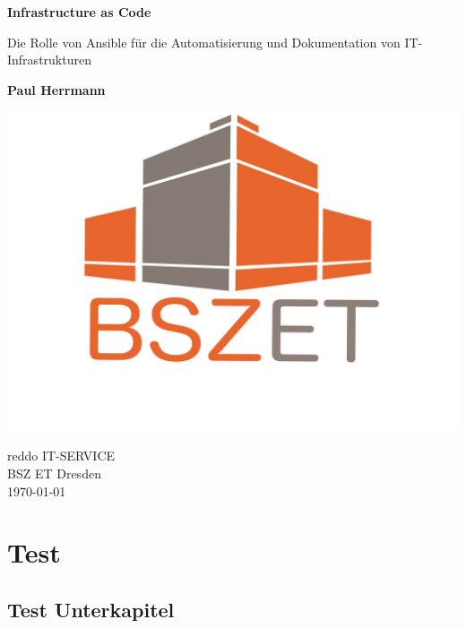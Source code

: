 \documentclass[11pt]{article}
\begin{document}
\begin{titlepage}
    \begin{center}
        \vspace*{1cm}
        
        \Huge
        \textbf{Infrastructure as Code}
        
        \Large
        \vspace{0.5cm}
        Die Rolle von Ansible für die Automatisierung und Dokumentation von 
        IT-Infrastrukturen
             
        \vspace{1.5cm}
 
        \textbf{Paul Herrmann}
 
        \vfill
                 
        \vspace{0.8cm}
      
        \includegraphics[width=1\textwidth]{Logo_Schule}
             
        reddo IT-SERVICE\\
        BSZ ET Dresden\\
        \today
             
    \end{center}
 \end{titlepage}

\thispagestyle{empty}
\pagebreak
\tableofcontents
\thispagestyle{empty}
\pagebreak
\setcounter{page}{1}
\section{Test}
\subsection{Test Unterkapitel}
\lipsum
\end{document}
